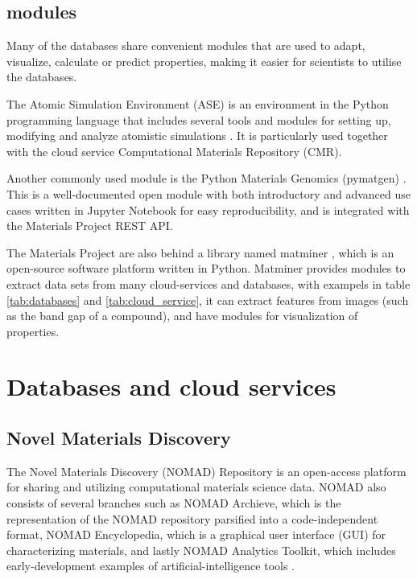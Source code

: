 


\subsection{modules}
Many of the databases share convenient modules that are used to adapt, visualize, calculate or predict properties, making it easier for scientists to utilise the databases.

The Atomic Simulation Environment (ASE) is an environment in the Python programming language that includes several tools and modules for setting up, modifying and analyze atomistic simulations \cite{Larsen2017}. It is particularly used together with the cloud service Computational Materials Repository (CMR).

Another commonly used module is the Python Materials Genomics (pymatgen) \cite{Ong2013}. This is a well-documented open module with both introductory and advanced use cases written in Jupyter Notebook for easy reproducibility, and is integrated with the Materials Project REST API.

The Materials Project are also behind a library named matminer \cite{Ward2018}, which is an open-source software platform written in Python. Matminer provides modules to extract data sets from many cloud-services and databases, with exampels in table \ref{tab:databases} and \ref{tab:cloud_service}, it can extract features from images (such as the band gap of a compound), and have modules for visualization of properties.

\section{Databases and cloud services}


\subsection{Novel Materials Discovery}

The Novel Materials Discovery (NOMAD) Repository is an open-access platform for sharing and utilizing computational materials science data. NOMAD also consists of several branches such as NOMAD Archieve, which is the representation of the NOMAD repository parsified into a code-independent format, NOMAD Encyclopedia, which is a graphical user interface (GUI) for characterizing materials, and lastly NOMAD Analytics Toolkit, which includes early-development examples of artificial-intelligence tools \cite{Draxl2019}.

